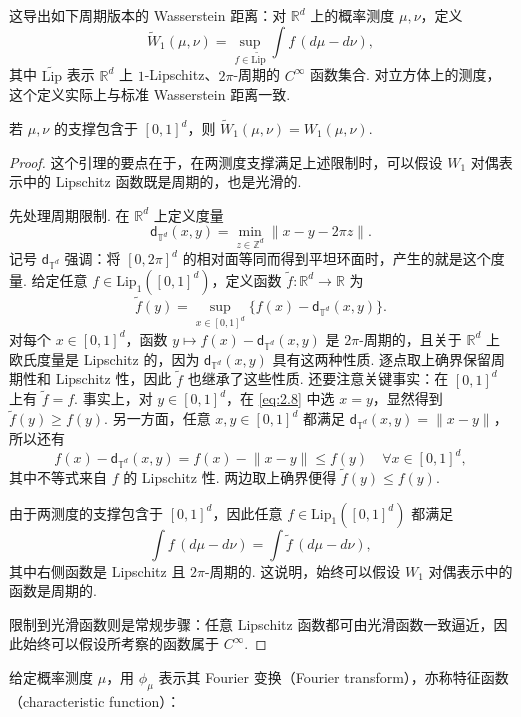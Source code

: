 这导出如下周期版本的 Wasserstein 距离：对 $\mathbb R^d$ 上的概率测度 $\mu,\nu$，定义
\begin{equation}\label{eq:2.7}
\widetilde W_1(\mu,\nu)=\sup_{f\in\widetilde{\mathrm{Lip}}}\int f\,(d\mu-d\nu),
\end{equation}
其中 $\widetilde{\mathrm{Lip}}$ 表示 $\mathbb R^d$ 上 $1$-Lipschitz、$2\pi$-周期的 $C^\infty$ 函数集合. 对立方体上的测度，这个定义实际上与标准 Wasserstein 距离一致.
\begin{lemma}\label{lem:2.8}
若 $\mu,\nu$ 的支撑包含于 $[0,1]^d$，则 $\widetilde W_1(\mu,\nu)=W_1(\mu,\nu)$.
\end{lemma}
\begin{proof}
这个引理的要点在于，在两测度支撑满足上述限制时，可以假设 $W_1$ 对偶表示中的 Lipschitz 函数既是周期的，也是光滑的.

先处理周期限制. 在 $\mathbb R^d$ 上定义度量
$$\mathsf d_{\mathbb T^d}(x,y)=\min_{z\in\mathbb Z^d}\lVert x-y-2\pi z\rVert.$$
记号 $\mathsf d_{\mathbb T^d}$ 强调：将 $[0,2\pi]^d$ 的相对面等同而得到平坦环面时，产生的就是这个度量. 给定任意 $f\in\mathrm{Lip}_1([0,1]^d)$，定义函数 $\tilde f:\mathbb R^d\to\mathbb R$ 为
\begin{equation}\label{eq:2.8}
\tilde f(y)=\sup_{x\in[0,1]^d}\{f(x)-\mathsf d_{\mathbb T^d}(x,y)\}.
\end{equation}
对每个 $x\in[0,1]^d$，函数 $y\mapsto f(x)-\mathsf d_{\mathbb T^d}(x,y)$ 是 $2\pi$-周期的，且关于 $\mathbb R^d$ 上欧氏度量是 Lipschitz 的，因为 $\mathsf d_{\mathbb T^d}(x,y)$ 具有这两种性质. 逐点取上确界保留周期性和 Lipschitz 性，因此 $\tilde f$ 也继承了这些性质. 还要注意关键事实：在 $[0,1]^d$ 上有 $\tilde f=f$. 事实上，对 $y\in[0,1]^d$，在 \eqref{eq:2.8} 中选 $x=y$，显然得到 $\tilde f(y)\ge f(y)$. 另一方面，任意 $x,y\in[0,1]^d$ 都满足 $\mathsf d_{\mathbb T^d}(x,y)=\lVert x-y\rVert$，所以还有
$$f(x)-\mathsf d_{\mathbb T^d}(x,y)=f(x)-\lVert x-y\rVert\le f(y)\quad\forall x\in[0,1]^d,$$
其中不等式来自 $f$ 的 Lipschitz 性. 两边取上确界便得 $\tilde f(y)\le f(y)$.

由于两测度的支撑包含于 $[0,1]^d$，因此任意 $f\in\mathrm{Lip}_1([0,1]^d)$ 都满足
$$\int f\,(d\mu-d\nu)=\int\tilde f\,(d\mu-d\nu),$$
其中右侧函数是 Lipschitz 且 $2\pi$-周期的. 这说明，始终可以假设 $W_1$ 对偶表示中的函数是周期的.

限制到光滑函数则是常规步骤：任意 Lipschitz 函数都可由光滑函数一致逼近，因此始终可以假设所考察的函数属于 $C^\infty$.
\end{proof}
给定概率测度 $\mu$，用 $\phi_\mu$ 表示其 Fourier 变换（Fourier transform），亦称特征函数（characteristic function）：
